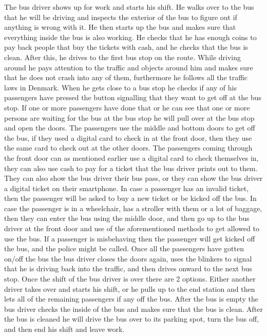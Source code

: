 The bus driver shows up for work and starts his shift. He walks over to the bus that he will be driving and inspects the exterior of the bus to figure out if anything is wrong with it. He then starts up the bus and makes sure that everything inside the bus is also working. He checks that he has enough coins to pay back people that buy the tickets with cash, and he checks that the bus is clean. After this, he drives to the first bus stop on the route. While driving around he pays attention to the traffic and objects around him and makes sure that he does not crash into any of them, furthermore he follows all the traffic laws in Denmark. When he gets close to a bus stop he checks if any of his passengers have pressed the button signalling that they want to get off at the bus stop. If one or more passengers have done that or he can see that one or more persons are waiting for the bus at the bus stop he will pull over at the bus stop and open the doors. The passengers use the middle and bottom doors to get off the bus, if they used a digital card to check in at the front door, then they use the same card to check out at the other doors. The passengers coming through the front door can as mentioned earlier use a digital card to check themselves in, they can also use cash to pay for a ticket that the bus driver prints out to them. They can also show the bus driver their bus pass, or they can show the bus driver a digital ticket on their smartphone. In case a passenger has an invalid ticket, then the passenger will be asked to buy a new ticket or be kicked off the bus. In case the passenger is in a wheelchair, has a stroller with them or a lot of baggage, then they can enter the bus using the middle door, and then go up to the bus driver at the front door and use of the aforementioned methods to get allowed to use the bus. If a passenger is misbehaving then the passenger will get kicked off the bus, and the police might be called. Once all the passengers have gotten on/off the bus the bus driver closes the doors again, uses the blinkers to signal that he is driving back into the traffic, and then drives onward to the next bus stop. Once the shift of the bus driver is over there are 2 options. Either another driver takes over and starts his shift, or he pulls up to the end station and then lets all of the remaining passengers if any off the bus. After the bus is empty the bus driver checks the inside of the bus and makes sure that the bus is clean. After the bus is cleaned he will drive the bus over to its parking spot, turn the bus off, and then end his shift and leave work.

